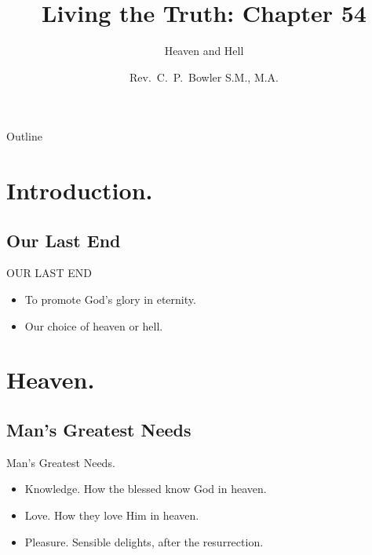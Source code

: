 \documentclass{beamer}
\title[Living the Truth 54] %
{Living the Truth: Chapter 54}
\subtitle
{Heaven and Hell} %
\author{Rev.~C.~P.~Bowler S.M., M.A.}
\begin{document}
\begin{frame}
  \titlepage
\end{frame}

\begin{frame}{Outline}
  \tableofcontents
\end{frame}





\section{Introduction.}

\subsection{Our Last End}

\begin{frame}{OUR LAST END}
\begin{itemize}
\item   To promote God's glory in eternity.
\item   Our choice of heaven or hell.
\end{itemize}
\end{frame}

\section{Heaven.}

\subsection{Man's Greatest Needs}
\begin{frame}{Man's Greatest Needs.}
\begin{itemize}
\item   Knowledge. How the blessed know God in heaven.
\item   Love. How they love Him in heaven.
\item   Pleasure. Sensible delights, after the resurrection.
\end{itemize}
\end{frame}
\end{document}
